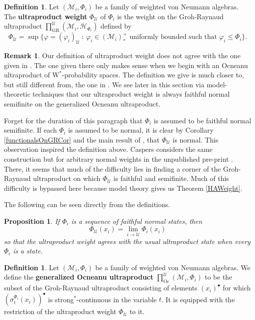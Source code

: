\documentclass[12pt]{amsart}
\newtheorem{prop}[thm]{Proposition}
\theoremstyle{definition}
\newtheorem{defn}[thm]{Definition}
\newtheorem{remark}[thm]{Remark}
\def\vp{\varphi}
\def\cal{\mathcal}
\newcommand{\wstar}{$\mathrm{W}^*$}
\newcommand\cU{{\cal U}}
\def \GR{\operatorname{GR}}
\def \Oc{\operatorname{Oc}}
\begin{document}
\begin{defn}
    Let $(\cal M_i, \Phi_i)$ be a family of weighted von Neumann algebras.  The \textbf{ultraproduct weight} $\Phi_{\cU}$ of $\Phi_i$ is the weight on the Groh-Raynaud ultraproduct $\prod_{\GR}^{\cU} (\cal M_i, \cal H_{\Phi_i})$ defined by
    \[
        \Phi_{\cU} = \sup \{\vp = (\vp_i)_{\cU} \ : \ \vp_i \in (\cal M_i)_{*}^+ \text{ uniformly bounded such that } \vp_i \leq \Phi_i\}.
    \]
\end{defn}

\begin{remark}
    Our definition of ultraproduct weight does not agree with the one given in \cite[Definition 4.25]{AH}.  The one given there only makes sense when we begin with an Ocneanu ultraproduct of \wstar-probability spaces.  The definition we give is much closer to, but still different from, the one in \cite{Cas}.  We see later in this section via model-theoretic techniques that our ultraproduct weight is always faithful normal semifinite on the generalized Ocneanu ultraproduct.
\end{remark}

Forget for the duration of this paragraph that $\Phi_i$ is assumed to be faithful normal semifinite.  If each $\Phi_i$ is assumed to be normal, it is clear by Corollary \ref{functionalsOnGRCor} and the main result of \cite{HaNormal}, that $\Phi_{\cU}$ is normal.  This observation inspired the definition above.  Caspers considers the same construction but for arbitrary normal weights in the unpublished pre-print \cite{Cas}.  There, it seems that much of the difficulty lies in finding a corner of the Groh-Raynaud ultraproduct on which $\Phi_{\cU}$ is faithful and semifinite.  Much of this difficulty is bypassed here because model theory gives us Theorem \ref{HAWeight}.

The following can be seen directly from the definitions.

\begin{prop}\label{ultraweights}
    If $\Phi_i$ is a sequence of faithful normal states, then
    \[
    \Phi_{\cU}(x_i) = \lim_{i \to \cU} \Phi_i(x_i)
    \]
    so that the ultraproduct weight agrees with the usual ultraproduct state when every $\Phi_i$ is a state.
\end{prop}

\begin{defn}\label{DefOc}
    Let $(\cal M_i, \Phi_i)$ be a family of weighted von Neumann algebras.  We define the \textbf{generalized Ocneanu ultraproduct} $\prod^{\cU}_{\Oc}(\cal M_i, \Phi_i)$ to be the subset of the Groh-Raynaud ultraproduct consisting of elements $(x_i)^\bullet$ for which $(\sigma_{t}^{\Phi_i}(x_i))^\bullet$ is strong$^*$-continuous in the variable $t$.  It is equipped with the restriction of the ultraproduct weight $\Phi_{\cU}$ to it.
\end{defn}
\end{document}
